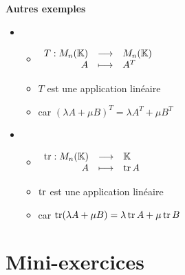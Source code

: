 \begin{frame}
\hfill{\textbf{Autres exemples}}
\bigskip

\begin{itemize}
  \item {}

  \begin{itemize}\setlength{\itemsep}{6pt}
  \item $\begin{array}{rcl}
T : M_{n}(\mathbb{K}) & \longrightarrow & M_{n}(\mathbb{K})\\
             A & \longmapsto & A^{T}
\end{array} $
  \item $T$ est une application linéaire
  \item car $(\lambda A + \mu B)^{T}=\lambda A^{T} + \mu B^{T}$
  \end{itemize}
 

\bigskip
\pause

  \item {}
  \begin{itemize}\setlength{\itemsep}{6pt}
  \item $\begin{array}{rcl}
\mathop{\text{tr}}\nolimits : M_{n}(\mathbb{K}) & \longrightarrow & \mathbb{K}\\
             A & \longmapsto & \mathop{\text{tr}}\nolimits{A}
\end{array} $
  \item $\mathop{\text{tr}}\nolimits$ est une application linéaire
  \item car $\mathop{\text{tr}}\nolimits(\lambda A + \mu B) = \lambda \mathop{\text{tr}}\nolimits A + \mu \mathop{\text{tr}}\nolimits B$
  \end{itemize}


\end{itemize}
\end{frame}


\section{Mini-exercices}

